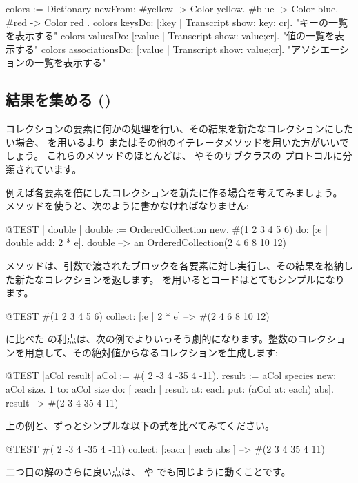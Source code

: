 \documentclass[a4paper,10pt,twoside]{book}
\begin{document}
\begin{code}{}
colors := Dictionary newFrom: { #yellow -> Color yellow. #blue -> Color blue. #red -> Color red }.
colors keysDo: [:key | Transcript show: key; cr].                    "キーの一覧を表示する"
colors valuesDo: [:value | Transcript show: value;cr].            "値の一覧を表示する"
colors associationsDo: [:value | Transcript show: value;cr].  "アソシエーションの一覧を表示する"
\end{code}

\subsection{結果を集める ()}
コレクションの要素に何かの処理を行い、その結果を新たなコレクションにしたい場合、 を用いるより またはその他のイテレータメソッドを用いた方がいいでしょう。
これらのメソッドのほとんどは、 やそのサブクラスの  プロトコルに分類されています。

例えば各要素を倍にしたコレクションを新たに作る場合を考えてみましょう。 メソッドを使うと、次のように書かなければなりません:

\begin{code}{@TEST | double |}
double := OrderedCollection new.
#(1 2 3 4 5 6) do: [:e | double add: 2 * e].
double --> an OrderedCollection(2 4 6 8 10 12)
\end{code}

\noindent
{} メソッドは、引数で渡されたブロックを各要素に対し実行し、その結果を格納した新たなコレクションを返します。
 を用いるとコードはとてもシンプルになります。
\begin{code}{@TEST}
#(1 2 3 4 5 6) collect: [:e | 2 * e] --> #(2 4 6 8 10 12)
\end{code}

 に比べた  の利点は、次の例でよりいっそう劇的になります。整数のコレクションを用意して、その絶対値からなるコレクションを生成します:

\begin{code}{@TEST |aCol result|}
aCol :=  #( 2 -3 4 -35 4 -11).
result := aCol species new: aCol size.
1 to: aCol size do: [ :each | result at: each put: (aCol at: each) abs].
result --> #(2 3 4 35 4 11)
\end{code}
\noindent
上の例と、ずっとシンプルな以下の式を比べてみてください。
\begin{code}{@TEST}
#( 2 -3 4 -35 4 -11) collect: [:each | each abs ] --> #(2 3 4 35 4 11)
\end{code}
\noindent
二つ目の解のさらに良い点は、 や  でも同じように動くことです。
\end{document}
